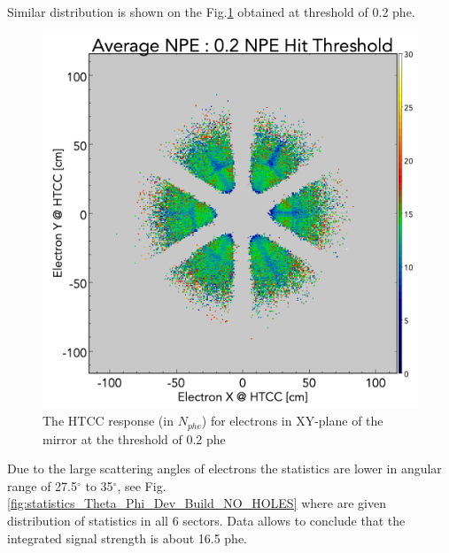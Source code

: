 Similar distribution is shown on the Fig.\ref{fig:avgNPE_XY_Dev_Build_02npe} obtained at threshold of 0.2 phe.
\begin{figure}[!h]
    \centering
    \includegraphics[width=1.0\linewidth,trim={0.0cm 0.0cm 0.0cm 1.67cm},clip]{images/avgNPE_XY_Dev_Build_02npe.png}
    \caption{The HTCC response (in $N_{phe}$) for electrons in XY-plane of the mirror at the threshold of 0.2 phe}
    \label{fig:avgNPE_XY_Dev_Build_02npe}
\end{figure}
Due to the large scattering angles of electrons the statistics are lower in angular range of 27.5$^\circ$ to 35$^\circ$, see Fig.\ref{fig:statistics_Theta_Phi_Dev_Build_NO_HOLES} where are given distribution of statistics in all 6 sectors. Data allows to conclude that the integrated signal strength is about 16.5 phe.
